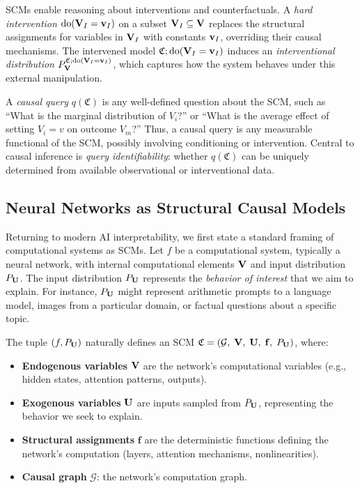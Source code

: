 SCMs enable reasoning about interventions and counterfactuals. A \emph{hard intervention} $\mathrm{do}(\mathbf{V}_I=\mathbf{v}_I)$ on a subset $\mathbf{V}_I\subseteq\mathbf{V}$ replaces the structural assignments for variables in $\mathbf{V}_I$ with constants $\mathbf{v}_I$, overriding their causal mechanisms. The intervened model $\mathfrak{C};\mathrm{do}(\mathbf{V}_I=\mathbf{v}_I)$ induces an \emph{interventional distribution} $P^{\mathfrak{C};\mathrm{do}(\mathbf{V}_I=\mathbf{v}_I)}_{\mathbf{V}}$, which captures how the system behaves under this external manipulation.

A \emph{causal query} $q(\mathfrak{C})$ is any well-defined question about the SCM, such as ``What is the marginal distribution of $V_i$?'' or ``What is the average effect of setting $V_i=v$ on outcome $V_m$?'' Thus, a causal query is any measurable functional of the SCM, possibly involving conditioning or intervention. Central to causal inference is \emph{query identifiability}: whether $q(\mathfrak{C})$ can be uniquely determined from available observational or interventional data.


\subsection{Neural Networks as Structural Causal Models}
Returning to modern AI interpretability, we first state a standard framing of computational systems as SCMs. Let $f$ be a computational system, typically a neural network, with internal computational elements $\mathbf{V}$ and input distribution $P_{\mathbf{U}}$. The input distribution $P_{\mathbf{U}}$ represents the \emph{behavior of interest} that we aim to explain. For instance, $P_{\mathbf{U}}$ might represent arithmetic prompts to a language model, images from a particular domain, or factual questions about a specific topic.

The tuple $(f, P_{\mathbf{U}})$ naturally defines an SCM $\mathfrak{C} = (\mathcal{G},\; \mathbf{V},\; \mathbf{U},\; \mathbf{f},\; P_{\mathbf{U}})$, where:
\begin{itemize}
  \item \textbf{Endogenous variables} $\mathbf{V}$ are the network's computational variables (e.g., hidden states, attention patterns, outputs).
  \item \textbf{Exogenous variables} $\mathbf{U}$ are inputs sampled from $P_{\mathbf{U}}$, representing the behavior we seek to explain.
  \item \textbf{Structural assignments} $\mathbf{f}$ are the deterministic functions defining the network's computation (layers, attention mechanisms, nonlinearities).
  \item \textbf{Causal graph} $\mathcal{G}$: the network's computation graph.
\end{itemize}

